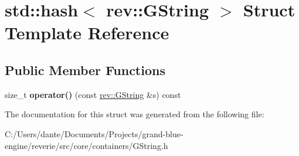 \hypertarget{structstd_1_1hash_3_01rev_1_1_g_string_01_4}{}\section{std\+::hash$<$ rev\+::G\+String $>$ Struct Template Reference}
\label{structstd_1_1hash_3_01rev_1_1_g_string_01_4}
\subsection*{Public Member Functions}
\begin{DoxyCompactItemize}
\item 
\mbox{\label{structstd_1_1hash_3_01rev_1_1_g_string_01_4_afae489b592059c2c26977ff684066abd}} 
size\+\_\+t {\bfseries operator()} (const \mbox{\hyperlink{classrev_1_1_g_string}{rev\+::\+G\+String}} \&s) const
\end{DoxyCompactItemize}


The documentation for this struct was generated from the following file\+:\begin{DoxyCompactItemize}
\item 
C\+:/\+Users/dante/\+Documents/\+Projects/grand-\/blue-\/engine/reverie/src/core/containers/G\+String.\+h\end{DoxyCompactItemize}
